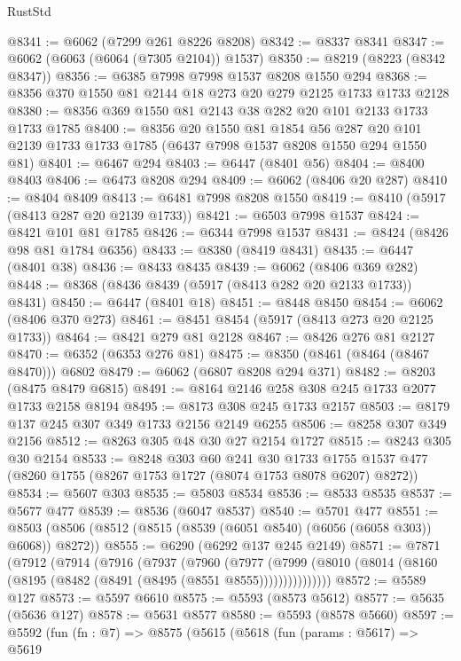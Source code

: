 \begin{lexlean}{RustStd}
\begin{coremodule}
@8341 := @6062 (@7299 @261 @8226 @8208)
@8342 := @8337 @8341
@8347 := @6062 (@6063 (@6064 (@7305 @2104)) @1537)
@8350 := @8219 (@8223 (@8342 @8347))
@8356 := @6385 @7998 @7998 @1537 @8208 @1550 @294
@8368 := @8356 @370 @1550 @81 @2144 @18 @273 @20 @279 @2125 @1733 @1733 @2128
@8380 := @8356 @369 @1550 @81 @2143 @38 @282 @20 @101 @2133 @1733 @1733 @1785
@8400 := @8356
    @20
    @1550
    @81
    @1854
    @56
    @287
    @20
    @101
    @2139
    @1733
    @1733
    @1785
    (@6437 @7998 @1537 @8208 @1550 @294 @1550 @81)
@8401 := @6467 @294
@8403 := @6447 (@8401 @56)
@8404 := @8400 @8403
@8406 := @6473 @8208 @294
@8409 := @6062 (@8406 @20 @287)
@8410 := @8404 @8409
@8413 := @6481 @7998 @8208 @1550
@8419 := @8410 (@5917 (@8413 @287 @20 @2139 @1733))
@8421 := @6503 @7998 @1537
@8424 := @8421 @101 @81 @1785
@8426 := @6344 @7998 @1537
@8431 := @8424 (@8426 @98 @81 @1784 @6356)
@8433 := @8380 (@8419 @8431)
@8435 := @6447 (@8401 @38)
@8436 := @8433 @8435
@8439 := @6062 (@8406 @369 @282)
@8448 := @8368 (@8436 @8439 (@5917 (@8413 @282 @20 @2133 @1733)) @8431)
@8450 := @6447 (@8401 @18)
@8451 := @8448 @8450
@8454 := @6062 (@8406 @370 @273)
@8461 := @8451 @8454 (@5917 (@8413 @273 @20 @2125 @1733))
@8464 := @8421 @279 @81 @2128
@8467 := @8426 @276 @81 @2127
@8470 := @6352 (@6353 @276 @81)
@8475 := @8350 (@8461 (@8464 (@8467 @8470))) @6802
@8479 := @6062 (@6807 @8208 @294 @371)
@8482 := @8203 (@8475 @8479 @6815)
@8491 := @8164 @2146 @258 @308 @245 @1733 @2077 @1733 @2158 @8194
@8495 := @8173 @308 @245 @1733 @2157
@8503 := @8179 @137 @245 @307 @349 @1733 @2156 @2149 @6255
@8506 := @8258 @307 @349 @2156
@8512 := @8263 @305 @48 @30 @27 @2154 @1727
@8515 := @8243 @305 @30 @2154
@8533 := @8248
    @303
    @60
    @241
    @30
    @1733
    @1755
    @1537
    @477
    (@8260 @1755 (@8267 @1753 @1727 (@8074 @1753 @8078 @6207) @8272))
@8534 := @5607 @303
@8535 := @5803 @8534
@8536 := @8533 @8535
@8537 := @5677 @477
@8539 := @8536 (@6047 @8537)
@8540 := @5701 @477
@8551 := @8503 (@8506 (@8512 (@8515 (@8539 (@6051 @8540) (@6056 (@6058 @303)) @6068)) @8272))
@8555 := @6290 (@6292 @137 @245 @2149)
@8571 := @7871
    (@7912
      (@7914
        (@7916
          (@7937
            (@7960
              (@7977
                (@7999 (@8010 (@8014 (@8160 (@8195 (@8482 (@8491 (@8495 (@8551 @8555)))))))))))))))
@8572 := @5589 @127
@8573 := @5597 @6610
@8575 := @5593 (@8573 @5612)
@8577 := @5635 (@5636 @127)
@8578 := @5631 @8577
@8580 := @5593 (@8578 @5660)
@8597 := @5592
    (fun (fn : @7) =>
    @8575
      (@5615
        (@5618
          (fun (params : @5617) =>
          @5619

\end{coremodule}
\end{lexlean}
